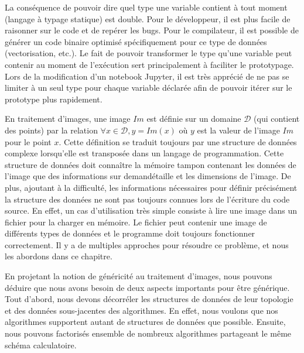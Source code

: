 La conséquence de pouvoir dire quel type une variable contient à tout moment (langage à typage statique) est double.
Pour le développeur, il est plus facile de raisonner sur le code et de repérer les bugs. Pour le compilateur, il est
possible de générer un code binaire optimisé spécifiquement pour ce type de données (vectorisation, etc.). Le fait de
pouvoir transformer le type qu'une variable peut contenir au moment de l'exécution sert principalement à faciliter le
prototypage. Lors de la modification d'un notebook Jupyter, il est très apprécié de ne pas se limiter à un seul type
pour chaque variable déclarée afin de pouvoir itérer sur le prototype plus rapidement.

En traitement d'images, une image \(Im\) est définie sur un domaine \(\mathcal{D}\) (qui contient des points) par la
relation \(\forall x \in \mathcal{D}, y = Im(x)\) où \(y\) est la valeur de l'image \(Im\) pour le point \(x\). Cette
définition se traduit toujours par une structure de données complexe lorsqu'elle est transposée dans un langage de
programmation. Cette structure de données doit connaître la mémoire tampon contenant les données de l'image que
des informations sur demandétaille et les dimensions de l'image. De plus, ajoutant à la difficulté, les informations
nécessaires pour définir précisément la structure des données ne sont pas toujours connues lors de l'écriture du code
source. En effet, un cas d'utilisation très simple consiste à lire une image dans un fichier pour la charger en mémoire.
Le fichier peut contenir une image de différents types de données et le programme doit toujours fonctionner
correctement. Il y a de multiples approches pour résoudre ce problème, et nous les abordons dans ce chapitre.

En projetant la notion de généricité au traitement d'images, nous pouvons déduire que nous avons besoin de deux aspects
importants pour être générique. Tout d'abord, nous devons décorréler les structures de données de leur topologie et des
données sous-jacentes des algorithmes. En effet, nous voulons que nos algorithmes supportent autant de structures de
données que possible. Ensuite, nous pouvons factorisés ensemble de nombreux algorithmes partageant le même schéma
calculatoire.

